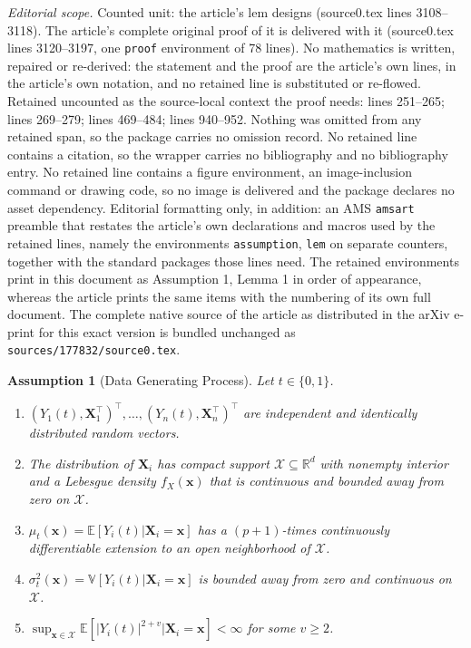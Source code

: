 \documentclass[10pt,a4paper]{amsart}
\newtheorem{assumption}{Assumption}
\newcommand{\E}{\mathbb{E}}
\newcommand{\Var}{\mathbb{V}}
\newcommand{\X}{\mathcal{X}}
\newcommand{\bX}{\mathbf{X}}
\newcommand{\bx}{\mathbf{x}}
\begin{document}
\noindent\textit{Editorial scope.} Counted unit: the article's lem designs (source0.tex lines 3108--3118). The article's complete original proof of it is delivered with it (source0.tex lines 3120--3197, one \texttt{proof} environment of 78 lines). No mathematics is written, repaired or re-derived: the statement and the proof are the article's own lines, in the article's own notation, and no retained line is substituted or re-flowed.  Retained uncounted as the source-local context the proof needs: lines 251--265; lines 269--279; lines 469--484; lines 940--952.  Nothing was omitted from any retained span, so the package carries no omission record.  No retained line contains a citation, so the wrapper carries no bibliography and no bibliography entry.  No retained line contains a figure environment, an image-inclusion command or drawing code, so no image is delivered and the package declares no asset dependency.  Editorial formatting only, in addition: an AMS \texttt{amsart} preamble that restates the article's own declarations and macros used by the retained lines, namely the environments \texttt{assumption}, \texttt{lem} on separate counters, together with the standard packages those lines need.  The retained environments print in this document as Assumption 1, Lemma 1 in order of appearance, whereas the article prints the same items with the numbering of its own full document.  The complete native source of the article as distributed in the arXiv e-print for this exact version is bundled unchanged as \texttt{sources/177832/source0.tex}.
\begin{assumption}[Data Generating Process]\label{sa-assump: Sharp DGP}
    Let $t\in\{0,1\}$.
    \begin{enumerate}[label=\normalfont(\roman*),noitemsep,leftmargin=*]

    \item $(Y_1(t), \bX_1^\top)^\top,\ldots, (Y_n(t), \bX_n^\top)^\top$ are independent and identically distributed random vectors.

    \item The distribution of $\bX_i$ has compact support $\X\subseteq\mathbb{R}^d$ with nonempty interior and a Lebesgue density $f_X(\bx)$ that is continuous and bounded away from zero on $\X$.

    \item $\mu_t(\bx) = \E[Y_i(t)| \bX_i = \bx]$ has a $(p+1)$-times continuously differentiable extension to an open neighborhood of $\X$.

    \item $\sigma^2_t(\bx) = \Var[Y_i(t)|\bX_i = \bx]$ is bounded away from zero and continuous on $\X$.

    \item $\sup_{\bx \in \X}\E[|Y_i(t)|^{2+v}|\bX_i = \bx] < \infty$ for some $v \geq 2$.
    \end{enumerate}
\end{assumption}
\end{document}
